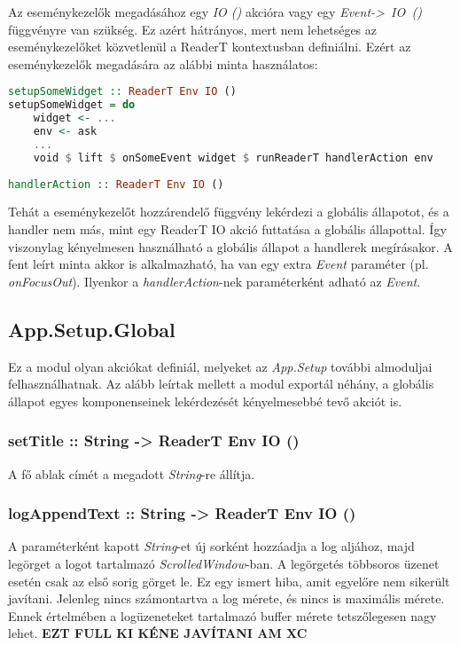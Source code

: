 Az eseménykezelők megadásához egy \textit{IO ()} akcióra vagy egy \mbox{\textit{Event-> IO ()}} függvényre van szükség. Ez azért hátrányos, mert nem lehetséges az eseménykezelőket közvetlenül a ReaderT kontextusban definiálni. Ezért az eseménykezelők megadására az alábbi minta használatos:

\begin{lstlisting}[language={Haskell}]
setupSomeWidget :: ReaderT Env IO ()
setupSomeWidget = do
	widget <- ...
	env <- ask
	...
	void $ lift $ onSomeEvent widget $ runReaderT handlerAction env
	
handlerAction :: ReaderT Env IO ()
\end{lstlisting}

Tehát a eseménykezelőt hozzárendelő függvény lekérdezi a globális állapotot, és a handler nem más, mint egy ReaderT IO akció futtatása a globális állapottal. Így viszonylag kényelmesen használható a globális állapot a handlerek megírásakor. A fent leírt minta akkor is alkalmazható, ha van egy extra \textit{Event} paraméter (pl. \textit{onFocusOut}).  Ilyenkor a \textit{handlerAction}-nek paraméterként adható az \textit{Event}.

\subsection{App.Setup.Global}

Ez a modul olyan akciókat definiál, melyeket az \textit{App.Setup} további almoduljai felhasználhatnak. Az alább leírtak mellett a modul exportál néhány, a globális állapot egyes komponenseinek lekérdezését kényelmesebbé tevő akciót is.

\subsubsection{setTitle :: String -> ReaderT Env IO ()}

A fő ablak címét a megadott \textit{String}-re állítja.

\subsubsection{logAppendText :: String -> ReaderT Env IO ()}

A paraméterként kapott \textit{String}-et új sorként hozzáadja a log aljához, majd legörget a logot tartalmazó \textit{ScrolledWindow}-ban. A legörgetés többsoros üzenet esetén csak az első sorig görget le. Ez egy ismert hiba, amit egyelőre nem sikerült javítani. Jelenleg nincs számontartva a log mérete, és nincs is maximális mérete. Ennek értelmében a logüzeneteket tartalmazó buffer mérete tetszőlegesen nagy lehet. \textbf{EZT FULL KI KÉNE JAVÍTANI AM XC}

